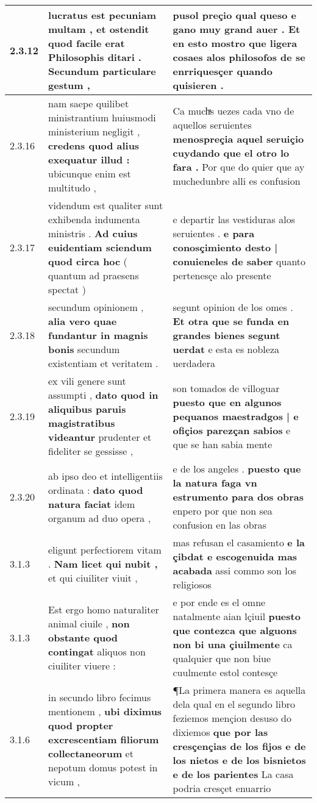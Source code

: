 \begin{tabular}{|p{1cm}|p{6.5cm}|p{6.5cm}|}
2.3.12 & lucratus est pecuniam multam , \textbf{ et ostendit quod facile erat Philosophis ditari . } Secundum particulare gestum , & pusol preçio qual queso e gano muy grand auer . \textbf{ Et en esto mostro que ligera cosaes alos philosofos de se } enrriquesçer quando quisieren . \\\hline
2.3.16 & nam saepe quilibet ministrantium huiusmodi ministerium negligit , \textbf{ credens quod alius exequatur illud : } ubicunque enim est multitudo , & Ca muchͣs uezes cada vno de aquellos seruientes \textbf{ menospreçia aquel seruiçio cuydando que el otro lo fara . } Por que do quier que ay muchedunbre alli es confusion \\\hline
2.3.17 & videndum est qualiter sunt exhibenda indumenta ministris . \textbf{ Ad cuius euidentiam sciendum quod circa hoc } ( quantum ad praesens spectat ) & e departir las vestiduras alos seruientes . \textbf{ e para conosçimiento desto | conuieneles de saber } quanto pertenesçe alo presente \\\hline
2.3.18 & secundum opinionem , \textbf{ alia vero quae fundantur in magnis bonis } secundum existentiam et veritatem . & segunt opinion de los omes . \textbf{ Et otra que se funda en grandes bienes segunt uerdat } e esta es nobleza uerdadera \\\hline
2.3.19 & ex vili genere sunt assumpti , \textbf{ dato quod in aliquibus paruis magistratibus videantur } prudenter et fideliter se gessisse , & son tomados de villoguar \textbf{ puesto que en algunos pequanos maestradgos | e ofiçios parezçan sabios } e que se han sabia mente \\\hline
2.3.20 & ab ipso deo et intelligentiis ordinata : \textbf{ dato quod natura faciat } idem organum ad duo opera , & e de los angeles . \textbf{ puesto que la natura faga vn estrumento para dos obras } enpero por que non sea confusion en las obras \\\hline
3.1.3 & eligunt perfectiorem vitam . \textbf{ Nam licet qui nubit , } et qui ciuiliter viuit , & mas refusan el casamiento \textbf{ e la çibdat e escogenuida mas acabada } assi commo son los religiosos \\\hline
3.1.3 & Est ergo homo naturaliter animal ciuile , \textbf{ non obstante quod contingat } aliquos non ciuiliter viuere : & e por ende es el omne natalmente aian lçiuil \textbf{ puesto que contezca que alguons non bi una çiuilmente } ca qualquier que non biue cuulmente estol contesçe \\\hline
3.1.6 & in secundo libro fecimus mentionem , \textbf{ ubi diximus quod propter excrescentiam filiorum collectaneorum } et nepotum domus potest in vicum , & ¶La primera manera es aquella dela qual en el segundo libro feziemos mençion desuso do dixiemos \textbf{ que por las cresçençias de los fijos e de los nietos e de los bisnietos e de los parientes } La casa podria cresçet enuarrio \\\hline

\end{tabular}
